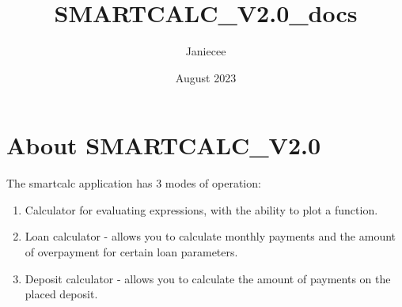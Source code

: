 \documentclass[14pt, letterpaper]{article}
\title{SMARTCALC\_V2.0\_docs}
\author{Janiecee}
\date{August 2023}
\begin{document}
\maketitle

\section*{About SMARTCALC\_V2.0}

The smartcalc application has 3 modes of operation:

\begin{enumerate}
    \item Calculator for evaluating expressions, with the ability to plot a function.
    \item Loan calculator - allows you to calculate monthly payments and the amount of overpayment for certain loan parameters.
    \item Deposit calculator - allows you to calculate the amount of payments on the placed deposit.
\end{enumerate}
\end{document}
